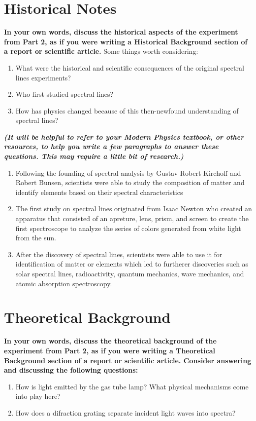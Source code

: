 \documentclass[prX,nofootinbib,notitlepage,12pt]{revtex4-1}
\begin{document}
\pagebreak

\section{Historical Notes}

\textbf{In your own words, discuss the historical aspects of the experiment from Part 2, as if you
were writing a Historical Background section of a report or scientific article.}
Some things worth considering:
\begin{enumerate}
    \item What were the historical and scientific consequences of the original spectral lines experiments?
    \item Who first studied spectral lines?
    \item How has physics changed because of this then-newfound understanding of spectral lines?
\end{enumerate}
\textbf{\textit{(It will be helpful to refer to your Modern Physics textbook, or other resources, to help you
write a few paragraphs to answer these questions. This may require a little bit of research.)}}

\begin{enumerate}
    \item Following the founding of spectral analysis by Gustav Robert Kirchoff and Robert Bunsen, scientists were able to study the composition of matter and identify elements based on their spectral characteristics
    \item The first study on spectral lines originated from Isaac Newton who created an apparatus that consisted of an apreture, lens, prism, and screen to create the first spectroscope to analyze the series of colors generated from white light from the sun.
    \item After the discovery of spectral lines, scientists were able to use it for identification of matter or elements which led to furtherer discoveries such as solar spectral lines, radioactivity, quantum mechanics, wave mechanics, and atomic absorption spectroscopy.
\end{enumerate}


\pagebreak
\section{Theoretical Background}

\textbf{In your own words, discuss the theoretical background of the experiment from Part 2, as if
you were writing a Theoretical Background section of a report or scientific article.
Consider answering and discussing the following questions:}
\begin{enumerate}[label=(\alph*)]
\item How is light emitted by the gas tube lamp? What physical mechanisms come into play
here?
\item How does a difraction grating separate incident light waves into spectra?
\end{enumerate}
\end{document}
